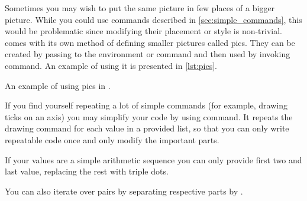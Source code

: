 Sometimes you may wish to put the same picture in few places of a bigger
picture. While you could use commands described in
\autoref{sec:simple_commands}, this would be problematic since modifying their
placement or style is non-trivial. \TikZ{} comes with its own method of
defining smaller pictures called pics. They can be created by passing
 to the \TikZ{} environment or command
and then used by invoking  command. An example of using it is
presented in \autoref{lst:pics}.
\begin{listing}
  \begin{example}[vertical_mode, examplewidth=0.9\linewidth]
\end{example}
  \caption{An example of using pics in \TikZ{}.}\label{lst:pics}
\end{listing}

If you find yourself repeating a lot of simple commands (for example, drawing
ticks on an axis) you may simplify your code by using  command. It
repeats the drawing command for each value in a provided list, so that you can
only write repeatable code once and only modify the important parts.
\begin{example}[vertical_mode, examplewidth=0.8\linewidth]
\end{example}
If your values are a simple arithmetic sequence you can only provide first two
and last value, replacing the rest with triple dots.
\begin{example}[vertical_mode, examplewidth=0.8\linewidth]
\end{example}
You can also iterate over pairs by separating respective parts by \ltx{/}.
\begin{example}
\end{example}


